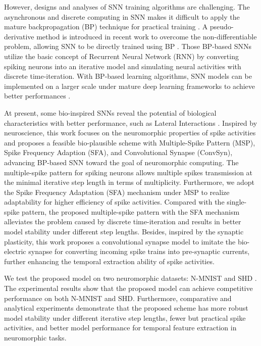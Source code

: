 \documentclass{article}
\begin{document}
However, designs and analyses of SNN training algorithms are challenging.
The asynchronous and discrete computing in SNN makes it difficult to apply the mature backpropagation (BP) technique for practical training \cite{pfeiffer_deep_2018}.
A pseudo-derivative method is introduced in recent work to overcome the non-differentiable problem, allowing SNN to be directly trained using BP \cite{wu_spatio-temporal_2018}.
Those BP-based SNNs utilize the basic concept of Recurrent Neural Network (RNN) by converting spiking neurons into an iterative model and simulating neural activities with discrete time-iteration.
With BP-based learning algorithms, SNN models can be implemented on a larger scale under mature deep learning frameworks to achieve better performances \cite{wu_direct_2019,wozniak_deep_2020}. 



At present, some bio-inspired SNNs reveal the potential of biological characteristics with better performance, such as Lateral Interactions \cite{cheng_lisnn_2020}.
Inspired by neuroscience, this work focuses on the neuromorphic properties of spike activities and proposes a feasible bio-plausible scheme with Multiple-Spike Pattern (MSP), Spike Frequency Adaption (SFA), and Convolutional Synapse (ConvSyn), advancing BP-based SNN toward the goal of neuromorphic computing.
The multiple-spike pattern for spiking neurons allows multiple spikes transmission at the minimal iterative step length in terms of multiplicity. Furthermore, we adopt the Spike Frequency Adaptation (SFA) mechanism under MSP to realize adaptability for higher efficiency of spike activities. Compared with the single-spike pattern, the proposed multiple-spike pattern with the SFA mechanism alleviates the problem caused by discrete time-iteration and results in better model stability under different step lengths.
Besides, inspired by the synaptic plasticity, this work proposes a convolutional synapse model to imitate the bio-electric synapse for converting incoming spike trains into pre-synaptic currents, further enhancing the temporal extraction ability of spike activities. 


We test the proposed model on two neuromorphic datasets: N-MNIST and SHD \cite{orchard_converting_2015,cramer_heidelberg_2020}. The experimental results show that the proposed model can achieve competitive performance on both N-MNIST and SHD. Furthermore, comparative and analytical experiments demonstrate that the proposed scheme has more robust model stability under different iterative step lengths, fewer but practical spike activities, and better model performance for temporal feature extraction in neuromorphic tasks.
 
\end{document}
